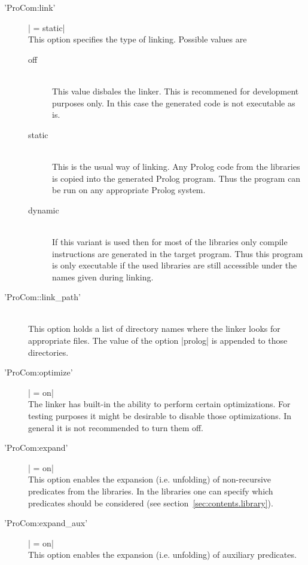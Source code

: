 \begin{description}

\item ['ProCom:link'] | = static|\\ 	This option specifies the type of
  linking. Possible values are
  \begin{description}
  \item [off]\ 
    \\
    This value disbales the linker. This is recommened for development
    purposes only. In this case the generated code is not executable as is.
  \item [static]\ 
    \\
    This is the usual way of linking. Any Prolog code from the libraries is
    copied into the generated Prolog program. Thus the program can be run on
    any appropriate Prolog system.
  \item [dynamic]\ 
    \\
    If this variant is used then for most of the libraries only compile
    instructions are generated in the target program. Thus this program is
    only executable if the used libraries are still accessible under the names
    given during linking.
  \end{description}

\item ['ProCom::link\_path']\label{opt:ProCom::link_path}\ 
  \\
  This option holds a list of directory names where the linker looks for
  appropriate files. The value of the option |prolog| is appended to those
  directories.

\item ['ProCom:optimize'] | = on|
  \\
  The linker has built-in the ability to perform certain optimizations.  For
  testing purposes it might be desirable to disable those optimizations.  In
  general it is not recommended to turn them off.

\item ['ProCom:expand'] | = on|\label{opt:ProCom:expand}
  \\
  This option enables the expansion (i.e. unfolding) of non-recursive
  predicates from the libraries. In the libraries one can specify which
  predicates should be considered (see section~\ref{sec:contents.library}).

\item ['ProCom:expand\_aux'] | = on|
  \\
  This option enables the expansion (i.e. unfolding) of auxiliary predicates.


\end{description}
